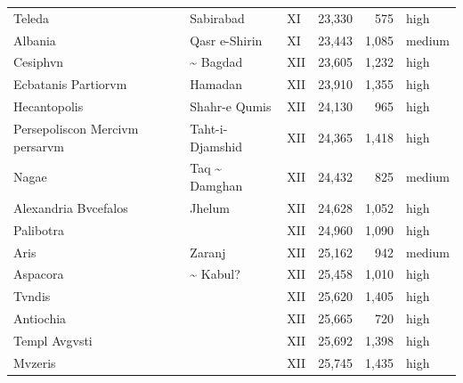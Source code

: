 \documentclass[11pt,a4paper]{article}
\begin{document}
{\begin{longtable}{p{4.6cm}p{5.2cm}lrrl}
Teleda & Sabirabad & XI & 23,330 & 575 & high\\
Albania & Qasr e-Shirin & XI & 23,443 & 1,085 & medium\\
Cesiphvn & \textasciitilde{} Bagdad & XII & 23,605 & 1,232 & high\\
Ecbatanis Partiorvm & Hamadan & XII & 23,910 & 1,355 & high\\
Hecantopolis & Shahr-e Qumis & XII & 24,130 & 965 & high\\
Persepoliscon Mercivm persarvm & Taht-i-Djamshid & XII & 24,365 & 1,418 & high\\
Nagae & Taq \textasciitilde{} Damghan & XII & 24,432 & 825 & medium\\
Alexandria Bvcefalos & Jhelum & XII & 24,628 & 1,052 & high\\
Palibotra &  & XII & 24,960 & 1,090 & high\\
Aris & Zaranj & XII & 25,162 & 942 & medium\\
Aspacora & \textasciitilde{} Kabul? & XII & 25,458 & 1,010 & high\\
Tvndis &  & XII & 25,620 & 1,405 & high\\
Antiochia &  & XII & 25,665 & 720 & high\\
Templ Avgvsti &  & XII & 25,692 & 1,398 & high\\
Mvzeris &  & XII & 25,745 & 1,435 & high\\
\bottomrule\end{longtable}}
\end{document}
